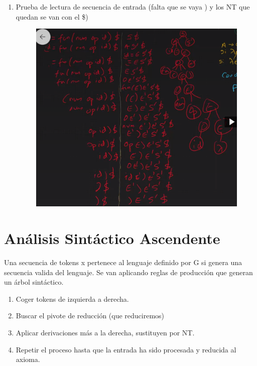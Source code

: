 \documentclass[12pt]{report} %
\begin{document}
\begin{enumerate}
\item
  Prueba de lectura de secuencia de entrada (falta que se vaya ) y los
  NT que quedan se van con el \$)

\begin{figure}[H]
	{\includegraphics[scale=.23]{image-20210320111752355.png}}
\end{figure}
  
\end{enumerate}

\section{Análisis Sintáctico Ascendente}

Una secuencia de tokens x pertenece al lenguaje definido por G si genera una secuencia valida del lenguaje. Se van aplicando reglas de producción que generan un árbol sintáctico.

\begin{enumerate}
  \item Coger tokens de izquierda a derecha.
  \item Buscar el pivote de reducción (que reduciremos)
  \item Aplicar derivaciones más a la derecha, sustituyen por NT.
  \item Repetir el proceso hasta que la entrada ha sido procesada y reducida al axioma.
\end{enumerate}
\end{document}

